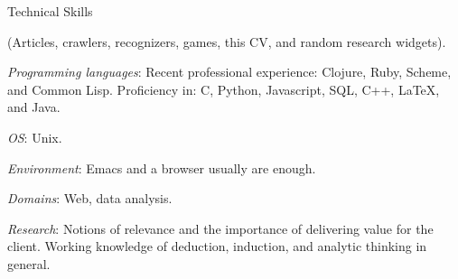 \begin{rubric}{Technical Skills}{

  (Articles, crawlers, recognizers, games, this CV, and random research widgets).

  \entry* \emph{Programming languages}: Recent professional
  experience: Clojure, Ruby, Scheme, and Common Lisp. Proficiency in:
  C, Python, Javascript, SQL, C++, \LaTeX{}, and Java.

  \entry* \emph{OS}: Unix.

  \entry* \emph{Environment}: Emacs and a browser usually are enough.

  \entry* \emph{Domains}: Web, data analysis.

  \entry* \emph{Research}: Notions of relevance and the importance of delivering value for the
  client. Working knowledge of deduction, induction, and analytic
  thinking in general.

}\end{rubric}
